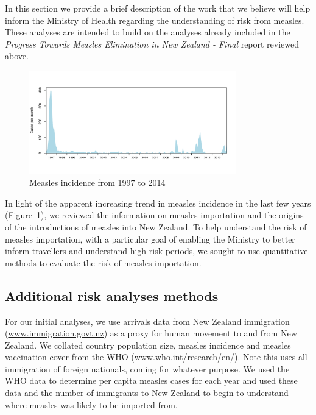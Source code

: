 \documentclass{article}
\begin{document}
In this section we provide a brief description of the work that we believe will help inform the Ministry of Health regarding the understanding of risk from measles. These analyses are intended to build on the analyses already included in the \emph {Progress Towards Measles Elimination in New Zealand - Final} report reviewed above.

\begin{figure}
     \centering
     \includegraphics[width=0.8\textwidth]{incidence_1997_2014.pdf}
     \caption{Measles incidence from 1997 to 2014}
     \label{fig:incidence1997}
\end{figure}

In light of the apparent increasing trend in measles incidence in the last few years (Figure~\ref{fig:incidence1997}), we reviewed the information on measles importation and the origins of the introductions of measles into New Zealand. To help understand the risk of measles importation, with a particular goal of enabling the Ministry to better inform travellers and understand high risk periods, we sought to use quantitative methods to evaluate the risk of measles importation. 

\subsection{Additional risk analyses methods}

For our initial analyses, we use arrivals data from New Zealand immigration (\href{http://www.immigration.govt.nz/}{www.immigration.govt.nz}) as a proxy for human movement to and from New Zealand. We collated country population size, measles incidence and measles vaccination cover from the WHO (\href{http://www.who.int/research/en/}{www.who.int/research/en/}). Note this uses all immigration of foreign nationals, coming for whatever purpose. We used the WHO data to determine per capita measles cases for each year and used these data and the number of immigrants to New Zealand to begin to understand where measles was likely to be imported from.
\end{document}
